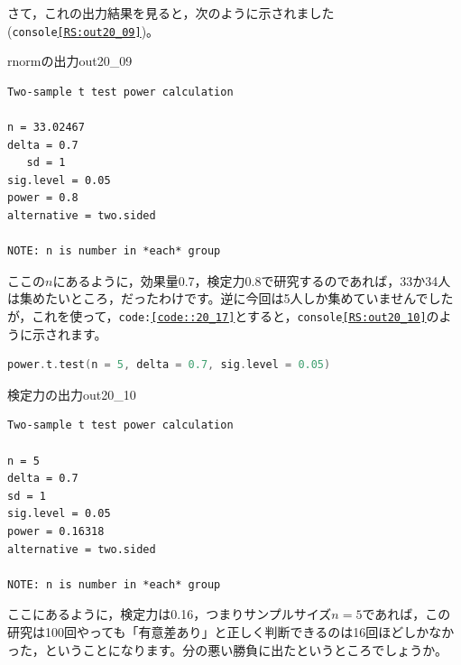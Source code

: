 \documentclass{ltjsbook}
\begin{document}
さて，これの出力結果を見ると，次のように示されました(\texttt{console\ref{RS:out20_09}})。
\begin{Rscreen}{rnormの出力}{out20_09}
\begin{verbatim}
Two-sample t test power calculation 

n = 33.02467
delta = 0.7
   sd = 1
sig.level = 0.05
power = 0.8
alternative = two.sided

NOTE: n is number in *each* group
\end{verbatim}
\end{Rscreen}
ここの$n$にあるように，効果量0.7，検定力0.8で研究するのであれば，33か34人は集めたいところ，だったわけです。逆に今回は5人しか集めていませんでしたが，これを使って，\texttt{code:\ref{code::20_17}}とすると，\texttt{console\ref{RS:out20_10}}のように示されます。

\begin{lstlisting}[language=c++,label={code::20_17},caption={power.t.testで$n$を固定}]
power.t.test(n = 5, delta = 0.7, sig.level = 0.05)
\end{lstlisting}

\begin{Rscreen}{検定力の出力}{out20_10}
\begin{verbatim}
Two-sample t test power calculation 

n = 5
delta = 0.7
sd = 1
sig.level = 0.05
power = 0.16318
alternative = two.sided

NOTE: n is number in *each* group
\end{verbatim}
\end{Rscreen}
ここにあるように，検定力は0.16，つまりサンプルサイズ$n=5$であれば，この研究は100回やっても「有意差あり」と正しく判断できるのは16回ほどしかなかった，ということになります。分の悪い勝負に出たというところでしょうか。
\end{document}
